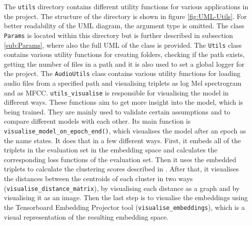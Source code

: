 \noindent
The \texttt{utils} directory contains different utility functions for various applications in the project. The structure of the directory is shown in figure \ref{fig:UML-Utils}. For better readability of the UML diagram, the argument type is omitted. The class \texttt{Params} is located within this directory but is further described in subsection \ref{sub:Params}, where also the full UML of the class is provided.
\newline
\newline
The \texttt{Utils} class contains various utility functions for creating folders, checking if the path exists, getting the number of files in a path and it is also used to set a global logger for the project.
\newline
\newline
The \texttt{AudioUtils} class contains various utility functions for loading audio files from a specified path and visualising triplets as log Mel spectrogram and as \gls{MFCC}.
\newline
\newline
\texttt{utils\_visualise} is responsible for visualising the model in different ways. These functions aim to get more insight into the model, which is being trained. They are mainly used to validate certain assumptions and to compare different models with each other. Its main function is \texttt{visualise\_model\_on\_epoch\_end()}, which visualises the model after an epoch as the name states. It does that in a few different ways. First, it embeds all of the triplets in the evaluation set in the embedding space and calculates the corresponding loss functions of the evaluation set. Then it uses the embedded triplets to calculate the clustering scores described in . After that, it visualises the distances between the centroids of each cluster in two ways (\texttt{visualise\_distance\_matrix}), by visualising each distance as a graph and by visualising it as an image. Then the last step is to visualise the embeddings using the Tensorboard Embedding Projector tool (\texttt{visualise\_embeddings}), which is a visual representation of the resulting embedding space.

